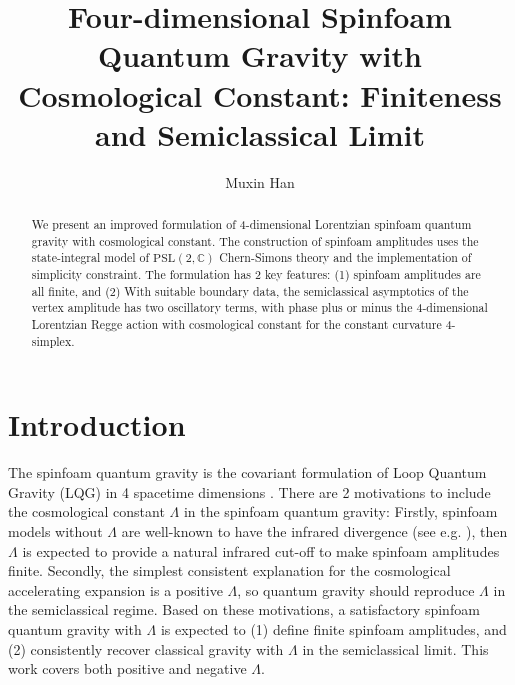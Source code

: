 \documentclass[aps,prd,notitlepage,nofootinbib,superscriptaddress,groupedaddress,twocolumn]{revtex4-1}
\newcommand{\PSlc}{\mathrm{PSL}(2,\mathbb{C})}
\renewcommand{\L }{\Lambda}
\begin{document}
\title{Four-dimensional Spinfoam Quantum Gravity with Cosmological Constant: Finiteness and Semiclassical Limit}


\author{Muxin Han}



\begin{abstract}

We present an improved formulation of 4-dimensional Lorentzian spinfoam quantum gravity with cosmological constant. The construction of spinfoam amplitudes uses the state-integral model of $\PSlc$ Chern-Simons theory and the implementation of simplicity constraint. The formulation has 2 key features: (1) spinfoam amplitudes are all finite, and (2) With suitable boundary data, the semiclassical asymptotics of the vertex amplitude has two oscillatory terms, with phase plus or minus the 4-dimensional Lorentzian Regge action with cosmological constant for the constant curvature 4-simplex.  

\end{abstract}



\maketitle


\tableofcontents



\section{Introduction}


The spinfoam quantum gravity is the covariant formulation of Loop Quantum Gravity (LQG) in 4 spacetime dimensions \cite{rovelli2014covariant,Perez2012}. %
There are 2 motivations to include the cosmological constant $\L$ in the spinfoam quantum gravity: Firstly, spinfoam models without $\L$ are well-known to have the infrared divergence (see e.g. \cite{Smerlak:2011fna,Riello2013,Dona:2018pxq}), then $\L$ is expected to provide a natural infrared cut-off to make spinfoam amplitudes finite. Secondly, the simplest consistent explanation for the cosmological accelerating expansion is a positive $\L$, so quantum gravity should reproduce $\L$ in the semiclassical regime. Based on these motivations, a satisfactory spinfoam quantum gravity with $\L$ is expected to (1) define finite spinfoam amplitudes, and (2) consistently recover classical gravity with $\L$ in the semiclassical limit. This work covers both positive and negative $\L$.
\end{document}
